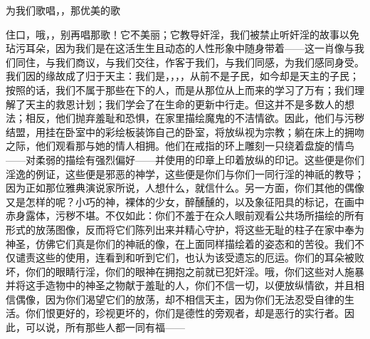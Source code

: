 \par

为我们歌唱，，那优美的歌\par

\par

住口，哦，，别再唱那歌！它不美丽；它教导奸淫，我们被禁止听奸淫的故事以免玷污耳朵，因为我们是在这活生生且动态的人性形象中随身带着——这一肖像与我们同住，与我们商议，与我们交往，作客于我们，与我们同感，为我们感同身受。我们因的缘故成了归于天主：我们是，，，，从前不是子民，如今却是天主的子民；按照的话，我们不属于那些在下的人，而是从那位从上而来的学习了万有；我们理解了天主的救恩计划；我们学会了在生命的更新中行走。但这并不是多数人的想法；相反，他们抛弃羞耻和恐惧，在家里描绘魔鬼的不洁情欲。因此，他们与污秽结盟，用挂在卧室中的彩绘板装饰自己的卧室，将放纵视为宗教；躺在床上的拥吻之际，他们观看那与她的情人相拥。他们在戒指的环上雕刻一只绕着盘旋的情鸟——对柔弱的描绘有强烈偏好——并使用的印章上印着放纵的印记。这些便是你们淫逸的例证，这些便是邪恶的神学，这些便是你们与你们一同行淫的神祇的教导；因为正如那位雅典演说家所说，人想什么，就信什么。另一方面，你们其他的偶像又是怎样的呢？小巧的神，裸体的少女，醉醺醺的，以及象征阳具的标记，在画中赤身露体，污秽不堪。不仅如此：你们不羞于在众人眼前观看公共场所描绘的所有形式的放荡图像，反而将它们陈列出来并精心守护，将这些无耻的柱子在家中奉为神圣，仿佛它们真是你们的神祇的像，在上面同样描绘着的姿态和的苦役。我们不仅谴责这些的使用，连看到和听到它们，也认为该受遗忘的厄运。你们的耳朵被败坏，你们的眼睛行淫，你们的眼神在拥抱之前就已犯奸淫。哦，你们这些对人施暴并将这手造物中的神圣之物献于羞耻的人，你们不信一切，以便放纵情欲，并且相信偶像，因为你们渴望它们的放荡，却不相信天主，因为你们无法忍受自律的生活。你们恨更好的，珍视更坏的，你们是德性的旁观者，却是恶行的实行者。因此，可以说，所有那些人都一同有福——\par

